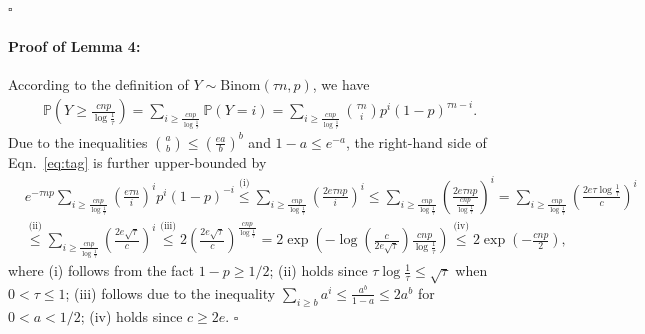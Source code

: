 \documentclass{article}
\begin{document}
\hfill $\square$\par

 \paragraph{Proof of Lemma 4:} 
    According to the definition of $Y \sim \text{Binom}(\tau n, p)$, we have
	\begin{align}
	\mathbb{P}\left( Y \geq \frac{cnp}{\log \frac{1}{\tau}} \right) = \sum_{i \geq \frac{cnp}{\log \frac{1}{\tau}}} \mathbb{P}(Y=i) = \sum_{i \geq \frac{cnp}{\log \frac{1}{\tau}}} \binom{\tau n}{i} p^i (1-p)^{\tau n - i}. \label{eq:tag}
	\end{align}
	Due to the inequalities $\binom{a}{b}\leq \left( \frac{ea}{b} \right)^b$ and $1-a \leq e^{-a}$, the right-hand side of Eqn.~\eqref{eq:tag} is further upper-bounded by
	$$
	\begin{aligned}
		& e^{-\tau n p}\sum_{i \geq \frac{cnp}{\log \frac{1}{\tau}}} \left( \frac{e \tau n}{i} \right)^i p^i (1-p)^{-i}  \overset{\text{(i)}}{\leq} \sum_{i \geq \frac{cnp}{\log \frac{1}{\tau}}} \left( \frac{2e \tau np}{i} \right)^i \leq \sum_{i \geq \frac{cnp}{\log \frac{1}{\tau}}} \left( \frac{2e \tau np}{\frac{cnp}{\log \frac{1}{\tau}}} \right)^i = \sum_{i \geq \frac{cnp}{\log \frac{1}{\tau}}} \left( \frac{2e \tau \log \frac{1}{\tau}}{c} \right)^i \\
		 & \overset{\text{(ii)}}{\leq} \sum_{i \geq \frac{cnp}{\log \frac{1}{\tau}}} \left( \frac{2e \sqrt{\tau}}{c} \right)^i \overset{\text{(iii)}}{\leq} 2\left( \frac{2e \sqrt{\tau}}{c} \right)^{\frac{cnp}{\log \frac{1}{\tau}}} = 2\exp \left( -\log \left( \frac{c}{2e \sqrt{\tau}} \right) \frac{cnp}{\log \frac{1}{\tau}} \right) \overset{\text{(iv)}}{\leq} 2\exp \left( - \frac{cnp}{2} \right),
	\end{aligned}
	$$
	where (i) follows from the fact $1-p \geq 1/2$; (ii) holds since $\tau \log \frac{1}{\tau} \leq \sqrt{\tau}$ when $0 < \tau \leq 1$; (iii) follows due to the inequality $\sum_{i \geq b} a^i \leq \frac{a^b}{1-a} \leq 2a^b$ for $0<a<1/2$; (iv) holds since $c\geq 2e$.
 \hfill $\square$\par
\end{document}
